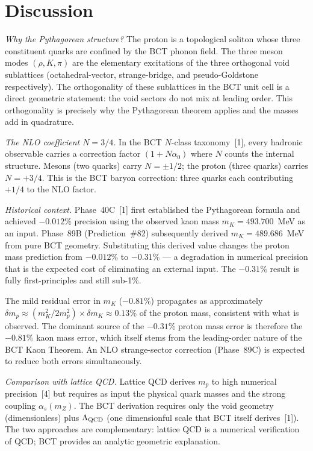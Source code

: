 \documentclass[10pt,twocolumn]{article}
\begin{document}
\section{Discussion}

\textit{Why the Pythagorean structure?} The proton is a topological soliton whose three
constituent quarks are confined by the BCT phonon field. The three meson modes $(\rho, K, \pi)$
are the elementary excitations of the three orthogonal void sublattices (octahedral-vector,
strange-bridge, and pseudo-Goldstone respectively). The orthogonality of these sublattices in
the BCT unit cell is a direct geometric statement: the void sectors do not mix at leading order.
This orthogonality is precisely why the Pythagorean theorem applies and the masses add in
quadrature.

\textit{The NLO coefficient $N = 3/4$.} In the BCT $N$-class taxonomy~[1], every hadronic
observable carries a correction factor $(1 + N\alpha_0)$ where $N$ counts the internal
structure. Mesons (two quarks) carry $N = \pm1/2$; the proton (three quarks) carries $N = +3/4$.
This is the BCT baryon correction: three quarks each contributing $+1/4$ to the NLO factor.

\textit{Historical context.} Phase~40C~[1] first established the Pythagorean formula and
achieved $-0.012\%$ precision using the observed kaon mass $m_K = 493.700$~MeV as an input.
Phase~89B (Prediction~\#82) subsequently derived $m_K = 489.686$~MeV from pure BCT geometry.
Substituting this derived value changes the proton mass prediction from $-0.012\%$ to $-0.31\%$
--- a degradation in numerical precision that is the expected cost of eliminating an external
input. The $-0.31\%$ result is fully first-principles and still sub-1\%.

The mild residual error in $m_K$ ($-0.81\%$) propagates as approximately
$\delta m_p \approx (m_K^2/2m_p^2)\times\delta m_K \approx 0.13\%$ of the proton mass,
consistent with what is observed. The dominant source of the $-0.31\%$ proton mass error is
therefore the $-0.81\%$ kaon mass error, which itself stems from the leading-order nature of
the BCT Kaon Theorem. An NLO strange-sector correction (Phase~89C) is expected to reduce both
errors simultaneously.

\textit{Comparison with lattice QCD.} Lattice QCD derives $m_p$ to high numerical
precision~[4] but requires as input the physical quark masses and the strong coupling
$\alpha_s(m_Z)$. The BCT derivation requires only the void geometry (dimensionless) plus
$\Lambda_{\rm QCD}$ (one dimensionful scale that BCT itself derives~[1]). The two approaches
are complementary: lattice QCD is a numerical verification of QCD; BCT provides an analytic
geometric explanation.
\end{document}

